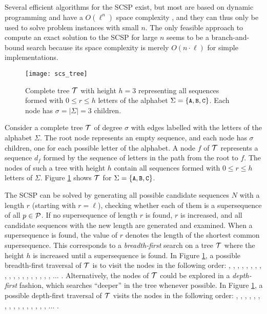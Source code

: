 Several efficient algorithms for the SCSP exist, but most are based on dynamic
programming and have a $O(\ell^n)$ space complexity \citep{Itoga1981,Foulser1992},
and they can thus only be used to solve problem instances with small $n$. The
only feasible approach to compute an exact solution to the SCSP for large $n$
seems to be a branch-and-bound search because its space complexity is merely
$O(n \cdot \ell)$ for simple implementations.

\begin{figure}[t]\centering
\texttt{[image: scs\_tree]}
\caption{\label{fig:scs_tree}%
  Complete tree ${\mathcal{T}}$ with height $h = 3$ representing all sequences formed
  with $0 \leq r \leq h$ letters of the alphabet $\Sigma = \{\text{\small{\tt A}},\text{\small{\tt B}},\text{\small{\tt C}}\}$.
  Each node has $\sigma = | \Sigma | = 3$ children.}
\end{figure}

Consider a complete tree ${\mathcal{T}}$ of degree $\sigma$ with edges labelled with the
letters of the alphabet $\Sigma$. The root node represents an empty sequence,
and each node has $\sigma$ children, one for each possible letter of the
alphabet. A node $f$ of ${\mathcal{T}}$ represents a sequence $d_f$ formed by the
sequence of letters in the path from the root to $f$. The nodes of such a tree
with height $h$ contain all sequences formed with $0 \leq r \leq h$ letters of
$\Sigma$. Figure \ref{fig:scs_tree} shows ${\mathcal{T}}$ for
$\Sigma = \{\text{\small{\tt A}},\text{\small{\tt B}},\text{\small{\tt C}}\}$.

The SCSP can be solved by generating all possible candidate sequences $N$ with a
length $r$ (starting with $r = \ell$), checking whether each of them is a
supersequence of all $p \in {\mathcal{P}}$. If no supersequence of length $r$ is
found, $r$ is increased, and all candidate sequences with the new length
are generated and examined. When a supersequence is found, the value of $r$
denotes the length of the shortest common supersequence. This corresponds to a
\textit{breadth-first} search on a tree ${\mathcal{T}}$ where the height $h$ is
increased until a supersequence is found. In Figure \ref{fig:scs_tree}, a
possible breadth-first traversal of ${\mathcal{T}}$ is to visit the nodes in the
following order: , , , , , ,
, , , , , , ,
, , , , , , $\ldots$
. Alternatively, the nodes of ${\mathcal{T}}$ could be explored in a
\textit{depth-first} fashion, which searches ``deeper'' in the tree whenever
possible. In Figure \ref{fig:scs_tree}, a possible depth-first traversal of
${\mathcal{T}}$ visits the nodes in the following order: , , ,
, , , , , , ,
, , , , , , $\ldots$
.

